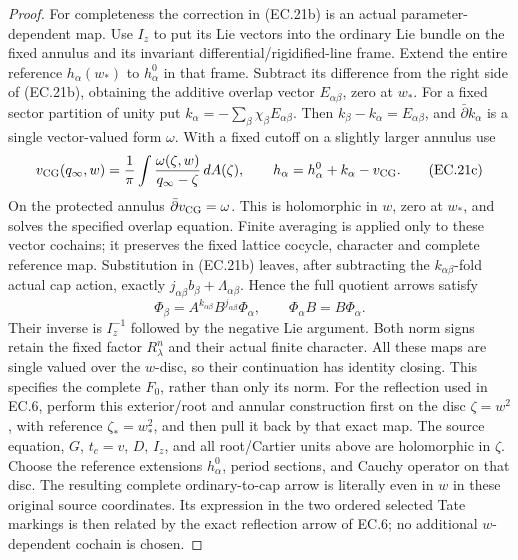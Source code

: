 \begin{proof}
For completeness the correction in (EC.21b) is an actual
parameter-dependent map. Use \(I_z\) to put its Lie vectors into
the ordinary Lie bundle on the fixed annulus and its invariant
differential/rigidified-line frame. Extend the entire reference
\(h_\alpha(w_*)\) to \(h_\alpha^0\) in that frame. Subtract its
difference from the right side of (EC.21b), obtaining the additive
overlap vector \(E_{\alpha\beta}\), zero at \(w_*\).
For a fixed sector partition of unity put
\(k_\alpha=-\sum_\beta\chi_\beta E_{\alpha\beta}\).
Then \(k_\beta-k_\alpha=E_{\alpha\beta}\), and
\(\bar\partial k_\alpha\) is a single vector-valued form \(\omega\).
With a fixed cutoff on a slightly larger annulus use
\[
 v_{\rm CG}(q_\infty,w)=\frac1\pi\int
      \frac{\omega(\zeta,w)}{q_\infty-\zeta}\,dA(\zeta),
 \qquad h_\alpha=h_\alpha^0+k_\alpha-v_{\rm CG}.
 \tag{EC.21c}
\]
On the protected annulus \(\bar\partial v_{\rm CG}=\omega\).
This is holomorphic in \(w\), zero at \(w_*\), and solves the
specified overlap equation. Finite averaging is applied only to
these vector cochains; it preserves the fixed lattice cocycle,
character and complete reference map. Substitution in (EC.21b)
leaves, after subtracting the \(k_{\alpha\beta}\)-fold actual cap
action, exactly \(j_{\alpha\beta}b_\beta+\Lambda_{\alpha\beta}\).
Hence the full quotient arrows satisfy
\[
 \Phi_\beta=A^{k_{\alpha\beta}}B^{j_{\alpha\beta}}\Phi_\alpha,
 \qquad \Phi_\alpha B=B\Phi_\alpha .
 \tag{EC.21}
\]
Their inverse is \(I_z^{-1}\) followed by the negative Lie
argument. Both norm signs retain the fixed factor \(R_\lambda^n\)
and their actual finite character. All these maps are single valued
over the \(w\)-disc, so their continuation has identity closing.
This specifies the complete \(F_0\), rather than only its norm.
For the reflection used in EC.6, perform this exterior/root and
annular construction first on the disc \(\zeta=w^2\), with
reference \(\zeta_*=w_*^2\), and then pull it back by that exact
map. The source equation, \(G\), \(t_c=v\), \(D\), \(I_z\), and
all root/Cartier units above are holomorphic in \(\zeta\).
Choose the reference extensions \(h_\alpha^0\), period sections,
and Cauchy operator on that disc. The resulting complete
ordinary-to-cap arrow is literally even in \(w\) in these
original source coordinates. Its expression in the two ordered
selected Tate markings is then related by the exact reflection
arrow of EC.6; no additional \(w\)-dependent cochain is chosen.


\end{proof}
